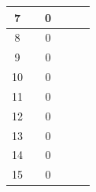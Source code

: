 \begin{table}[]
\begin{tabular}{|c|c|c|c|c|c|}
 			7                                            &                                  & 0                                &                                  &                                  &                                                     \\ \hline
 			8                                            &                                  & 0                                &                                  &                                  &                                                     \\ \hline
 			9                                            &                                  & 0                                &                                  &                                  &                                                     \\ \hline
 			10                                           &                                  & 0                                &                                  &                                  &                                                     \\ \hline
 			11                                           &                                  & 0                                &                                  &                                  &                                                     \\ \hline
 			12                                           &                                  & 0                                &                                  &                                  &                                                     \\ \hline
 			13                                           &                                  & 0                                &                                  &                                  &                                                     \\ \hline
 			14                                           &                                  & 0                                &                                  &                                  &                                                     \\ \hline
 			15                                           &                                  & 0                                &                                  &                                  &                                                     \\ \hline

\end{tabular}
\end{table}
